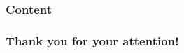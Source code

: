 %
%

\begin{frame}
	\titlepage
\end{frame}

\begin{frame}
	\frametitle{Content}
	\setcounter{tocdepth}{1}
	\tableofcontents
\end{frame}

	
	
		
%


	
\begin{frame}
	\frametitle{Thank you for your attention!}
\end{frame}